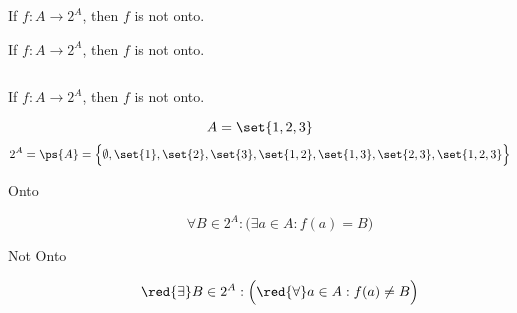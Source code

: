 
\begin{frame}{}
  \begin{theorem}
    If $f: A \to 2^{A}$, then $f$ is not onto.
  \end{theorem}

  \pause
  \vspace{0.60cm}
\end{frame}

\begin{frame}{}
  \begin{theorem}
    If $f: A \to 2^{A}$, then $f$ is not onto.
  \end{theorem}

  \vspace{0.60cm}
  \begin{columns}
    \pause
    \pause
    \pause
  \end{columns}
\end{frame}

\begin{frame}{}
  \begin{theorem}
    If $f: A \to 2^{A}$, then $f$ is not onto.
  \end{theorem}

  \vspace{0.30cm}
  \[
    A = \set{1,2,3}
  \]
  \pause
  \[
    2^{A} = \ps{A} = \Big\{\emptyset, \set{1}, \set{2}, \set{3}, \set{1,2}, \set{1,3}, \set{2,3}, \set{1,2,3}\Big\}
  \]

  \pause
  \begin{description}
    \item[Onto]
      \[
	\forall B \in 2^{A}: \Big(\exists a \in A: f(a) = B\Big)
      \]
    \pause
    \item[Not Onto]
      \[
	\red{\exists} B \in 2^{A}: \Big(\red{\forall} a \in A: f(a) \neq B\Big)
      \]
  \end{description}
\end{frame}

